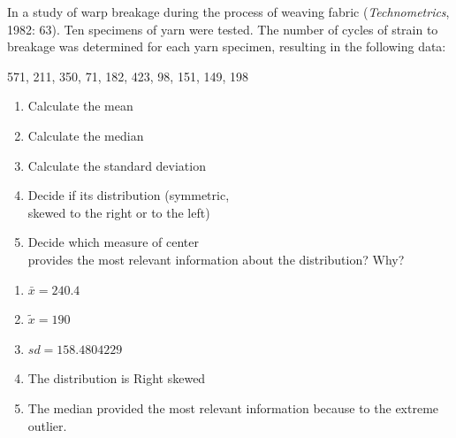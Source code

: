 \documentclass[11pt, chapterprefix=true]{scrbook}\usepackage[]{graphicx}\usepackage[]{color}
\begin{document}
\begin{exercises}
\begin{exercise}
\end{exercise}
\begin{solution}  %



\end{solution}


\begin{exercise} %


In a study of warp breakage during the process of weaving fabric (\textit{Technometrics}, 1982: 63).  Ten specimens of yarn were tested.  The number of cycles of strain to breakage was determined for each yarn specimen, resulting in the following data:

571, 211, 350, 71, 182, 423, 98, 151, 149, 198 \\

\begin{enumerate}
\item Calculate the mean
\item Calculate the median
\item Calculate the standard deviation
\item Decide if its distribution (symmetric, \\ skewed to the right or to the left)
\item Decide which measure of center \\ provides the most relevant information about the distribution? Why?
\end{enumerate}

\end{exercise}
\begin{solution}   %

\begin{enumerate}
\item $\bar{x} = 240.4$
\item $\tilde{x} = 190$
\item $sd = 158.4804229 $
\item The distribution is Right skewed
\item The median provided the most relevant information because to the extreme outlier.
\end{enumerate}


\end{solution}
\end{exercises}
\end{document}
